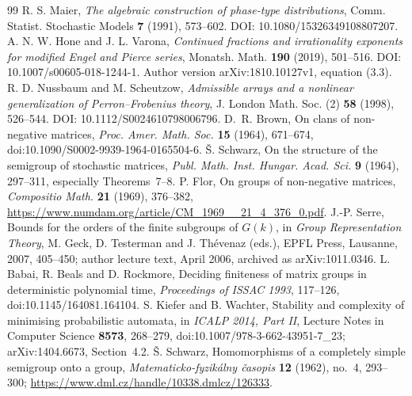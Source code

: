 \begin{thebibliography}{99}
 R. S. Maier, \emph{The algebraic construction of phase-type distributions}, Comm. Statist. Stochastic Models \textbf{7} (1991), 573--602. DOI: 10.1080/15326349108807207.
 A. N. W. Hone and J. L. Varona, \emph{Continued fractions and irrationality exponents for modified Engel and Pierce series}, Monatsh. Math. \textbf{190} (2019), 501--516. DOI: 10.1007/s00605-018-1244-1. Author version arXiv:1810.10127v1, equation (3.3).
 R. D. Nussbaum and M. Scheutzow, \emph{Admissible arrays and a nonlinear generalization of Perron--Frobenius theory}, J. London Math. Soc. (2) \textbf{58} (1998), 526--544. DOI: 10.1112/S0024610798006796.
 D.~R. Brown, On clans of non-negative matrices,
\emph{Proc. Amer. Math. Soc.} \textbf{15} (1964), 671--674,
doi:10.1090/S0002-9939-1964-0165504-6.
 \v{S}. Schwarz, On the structure of the semigroup of
stochastic matrices, \emph{Publ. Math. Inst. Hungar. Acad. Sci.}
\textbf{9} (1964), 297--311, especially Theorems~7--8.
 P. Flor, On groups of non-negative matrices,
\emph{Compositio Math.} \textbf{21} (1969), 376--382,
\url{https://www.numdam.org/article/CM_1969__21_4_376_0.pdf}.
 J.-P. Serre, Bounds for the orders of the finite subgroups
of $G(k)$, in \emph{Group Representation Theory}, M. Geck, D. Testerman
and J. Th\'evenaz (eds.), EPFL Press, Lausanne, 2007, 405--450;
author lecture text, April 2006, archived as arXiv:1011.0346.
 L. Babai, R. Beals and D. Rockmore,
Deciding finiteness of matrix groups in deterministic polynomial time,
\emph{Proceedings of ISSAC 1993}, 117--126,
doi:10.1145/164081.164104.
 S. Kiefer and B. Wachter, Stability and complexity
of minimising probabilistic automata, in \emph{ICALP 2014, Part II},
Lecture Notes in Computer Science \textbf{8573}, 268--279,
doi:10.1007/978-3-662-43951-7\_23; arXiv:1404.6673, Section~4.2.
 \v{S}. Schwarz, Homomorphisms of a completely simple
semigroup onto a group, \emph{Matematicko-fyzik\'alny \v{c}asopis}
\textbf{12} (1962), no.~4, 293--300;
\url{https://www.dml.cz/handle/10338.dmlcz/126333}.


\end{thebibliography}
